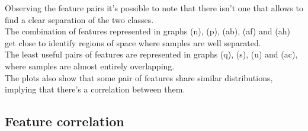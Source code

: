 \documentclass[12pt,a4paper]{article}
\begin{document}
\begin{figure}
\begin{center}
\begin{tabular}{ccc}
        \end{tabular}
    \end{center}
\end{figure}

% 
% 

Observing the feature pairs it's possible to note that there isn't one that allows to find a clear separation of the two classes.
\vspace*{0.5cm}\\
The combination of features represented in graphs (n), (p), (ab), (af) and (ah) get close to identify regions of space where samples are well separated.
\vspace*{0.5cm}\\
The least useful pairs of features are represented in graphs (q), (s), (u) and (ac), where samples are almost entirely overlapping.
\vspace*{0.5cm}\\
The plots also show that some pair of features share similar distributions, implying that there's a correlation between them.

\clearpage
\subsection{Feature correlation}
\end{document}

